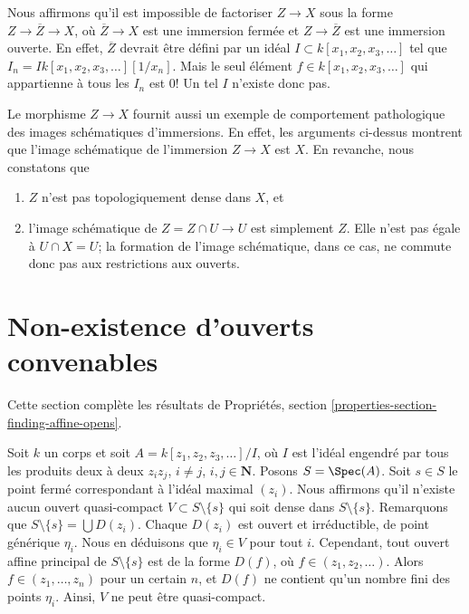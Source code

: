 \medskip\noindent
Nous affirmons qu'il est impossible de factoriser $Z \to X$ sous la forme
$Z \to \overline{Z} \to X$, où $\overline{Z} \to X$ est une immersion fermée
et $Z \to \overline{Z}$ est une immersion ouverte. En effet, $\overline{Z}$ devrait
être défini par un idéal $I \subset k[x_1, x_2, x_3, \ldots]$
tel que $I_n = I k[x_1, x_2, x_3, \ldots][1/x_n]$.
Mais le seul élément $f \in k[x_1, x_2, x_3, \ldots]$
qui appartienne à tous les $I_n$ est $0$! Un tel $I$ n'existe donc pas.

\medskip\noindent
Le morphisme $Z \to X$ fournit aussi un exemple de comportement pathologique
des images schématiques d'immersions. En effet, les arguments ci-dessus
montrent que l'image schématique de l'immersion $Z \to X$ est $X$.
En revanche, nous constatons que
\begin{enumerate}
\item $Z$ n'est pas topologiquement dense dans $X$, et
\item l'image schématique de $Z = Z \cap U \to U$ est simplement
$Z$. Elle n'est pas égale à $U \cap X = U$; la formation
de l'image schématique, dans ce cas,
ne commute donc pas aux restrictions aux ouverts.
\end{enumerate}






\section{Non-existence d'ouverts convenables}
\label{section-nonexistence-opens}

\noindent
Cette section complète les résultats de
Propriétés, section \ref{properties-section-finding-affine-opens}.

\medskip\noindent
Soit $k$ un corps et soit $A = k[z_1, z_2, z_3, \ldots]/I$, où $I$
est l'idéal engendré par tous les produits deux à deux
$z_iz_j$, $i \not = j$, $i, j \in \mathbf{N}$. Posons $S = \Spec(A)$.
Soit $s \in S$ le point fermé correspondant à l'idéal
maximal $(z_i)$. Nous affirmons qu'il n'existe aucun ouvert
quasi-compact $V \subset S \setminus \{s\}$ qui soit
dense dans $S \setminus \{s\}$. Remarquons que $S \setminus \{s\} = \bigcup D(z_i)$.
Chaque $D(z_i)$ est ouvert et irréductible, de point générique
$\eta_i$. Nous en déduisons que $\eta_i \in V$ pour tout $i$.
Cependant, tout ouvert affine principal de $S \setminus \{s\}$ est
de la forme $D(f)$, où $f \in (z_1, z_2, \ldots)$. Alors
$f \in (z_1, \ldots, z_n)$ pour un certain $n$, et $D(f)$ ne contient
qu'un nombre fini des points $\eta_i$. Ainsi, $V$ ne peut être quasi-compact.

